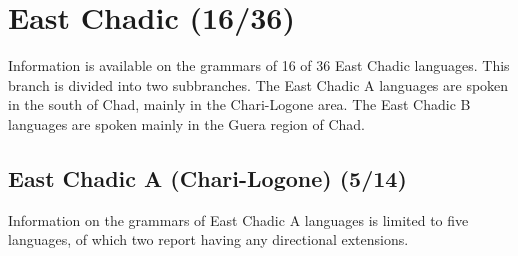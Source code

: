 \chapter{East Chadic (16/36)}

Information is available on the grammars of 16 of 36 East Chadic languages. This branch is divided into two subbranches. The East Chadic A languages are spoken in the south of Chad, mainly in the Chari-Logone area. The East Chadic B languages are spoken mainly in the Guera region of Chad. 

\section{East Chadic A (Chari-Logone) (5/14)}

Information on the grammars of East Chadic A languages is limited to five languages, of which two report having any directional extensions. 



